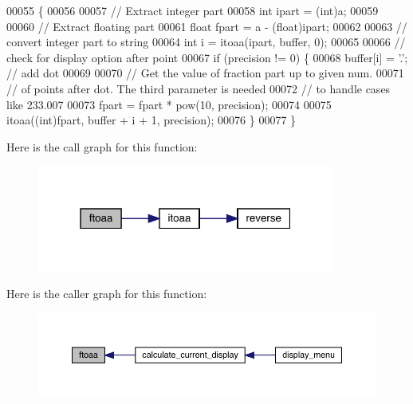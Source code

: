 \begin{DoxyCode}
00055                                                  \{
00056 
00057   \textcolor{comment}{// Extract integer part}
00058   \textcolor{keywordtype}{int} ipart = (int)a;
00059 
00060   \textcolor{comment}{// Extract floating part}
00061   \textcolor{keywordtype}{float} fpart = a - (float)ipart;
00062 
00063   \textcolor{comment}{// convert integer part to string}
00064   \textcolor{keywordtype}{int} i = itoaa(ipart, buffer, 0);
00065 
00066   \textcolor{comment}{// check for display option after point}
00067   \textcolor{keywordflow}{if} (precision != 0) \{
00068     buffer[i] = \textcolor{charliteral}{'.'}; \textcolor{comment}{// add dot}
00069 
00070     \textcolor{comment}{// Get the value of fraction part up to given num.}
00071     \textcolor{comment}{// of points after dot. The third parameter is needed}
00072     \textcolor{comment}{// to handle cases like 233.007}
00073     fpart = fpart * pow(10, precision);
00074 
00075     itoaa((\textcolor{keywordtype}{int})fpart, buffer + i + 1, precision);
00076   \}
00077 \}
\end{DoxyCode}
Here is the call graph for this function\+:\nopagebreak
\begin{figure}[H]
\begin{center}
\leavevmode
\includegraphics[width=277pt]{vlib_8c_a4d26b0ac2f26341d827e0a13a0bd49b6_cgraph}
\end{center}
\end{figure}
Here is the caller graph for this function\+:\nopagebreak
\begin{figure}[H]
\begin{center}
\leavevmode
\includegraphics[width=350pt]{vlib_8c_a4d26b0ac2f26341d827e0a13a0bd49b6_icgraph}
\end{center}
\end{figure}
\mbox{\label{vlib_8c_a28dc918c0df16add26908891a4aa190e}} 
